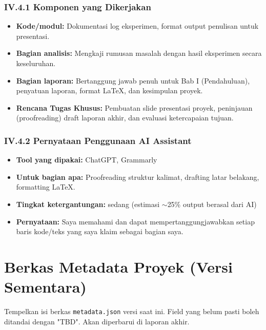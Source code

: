 \documentclass[12pt,a4paper]{article}
\begin{document}
\subsubsection*{IV.4.1 Komponen yang Dikerjakan}
\begin{itemize}
    \item \textbf{Kode/modul:} Dokumentasi log eksperimen, format output penulisan untuk presentasi.
    \item \textbf{Bagian analisis:} Mengkaji rumusan masalah dengan hasil eksperimen secara keseluruhan.
    \item \textbf{Bagian laporan:} Bertanggung jawab penuh untuk Bab I (Pendahuluan), penyatuan laporan, format LaTeX, dan kesimpulan proyek.
    \item \textbf{Rencana Tugas Khusus:} Pembuatan slide presentasi proyek, peninjauan (proofreading) draft laporan akhir, dan evaluasi ketercapaian tujuan.
\end{itemize}

\subsubsection*{IV.4.2 Pernyataan Penggunaan AI Assistant}
\begin{itemize}
    \item \textbf{Tool yang dipakai:} ChatGPT, Grammarly
    \item \textbf{Untuk bagian apa:} Proofreading struktur kalimat, drafting latar belakang, formatting LaTeX.
    \item \textbf{Tingkat ketergantungan:} sedang (estimasi $\sim$25\% output berasal dari AI)
    \item \textbf{Pernyataan:} Saya memahami dan dapat mempertanggungjawabkan setiap baris kode/teks yang saya klaim sebagai bagian saya.
\end{itemize}

\newpage
\appendix

\section{Berkas Metadata Proyek (Versi Sementara)}
Tempelkan isi berkas \texttt{metadata.json} versi saat ini. Field yang belum pasti boleh ditandai dengan "TBD". Akan diperbarui di laporan akhir.
\end{document}
